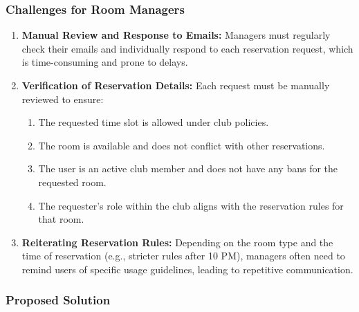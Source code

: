 \subsubsection{Challenges for Room Managers}

\begin{enumerate}
  \item \textbf{Manual Review and Response to Emails:} Managers must regularly check their emails and individually respond to each reservation request, which is time-consuming and prone to delays. 
  \item \textbf{Verification of Reservation Details:} Each request must be manually reviewed to ensure:
\begin{enumerate}
  \item The requested time slot is allowed under club policies.
  \item The room is available and does not conflict with other reservations.
  \item The user is an active club member and does not have any bans for the requested room.
  \item The requester’s role within the club aligns with the reservation rules for that room.
\end{enumerate}
  \item \textbf{Reiterating Reservation Rules:} Depending on the room type and the time of reservation (e.g., stricter rules after 10 PM), managers often need to remind users of specific usage guidelines, leading to repetitive communication.
\end{enumerate}

\subsubsection{Proposed Solution}

